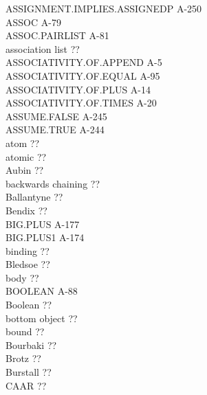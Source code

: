 \documentclass[10pt]{book}
\newenvironment{pubasis}{\begin{flushleft}}{\end{flushleft}}
\begin{document}
\begin{pubasis}
ASSIGNMENT.IMPLIES.ASSIGNEDP                 A-250\\
ASSOC                                        A-79\\
ASSOC.PAIRLIST                               A-81\\
association list                             ??\\
ASSOCIATIVITY.OF.APPEND                      A-5\\
ASSOCIATIVITY.OF.EQUAL                       A-95\\
ASSOCIATIVITY.OF.PLUS                        A-14\\
ASSOCIATIVITY.OF.TIMES                       A-20\\
ASSUME.FALSE                                 A-245\\
ASSUME.TRUE                                  A-244\\
atom                                         ??\\
atomic                                       ??\\
Aubin                                        ??\\
backwards chaining                           ??\\
Ballantyne                                   ??\\
Bendix                                       ??\\
BIG.PLUS                                     A-177\\
BIG.PLUS1                                    A-174\\
binding                                      ??\\
Bledsoe                                      ??\\
body                                         ??\\
BOOLEAN                                      A-88\\
Boolean                                      ??\\
bottom object                                ??\\
bound                                        ??\\
Bourbaki                                     ??\\
Brotz                                        ??\\
Burstall                                     ??\\
CAAR                                         ??\\

\end{pubasis}
\end{document}

